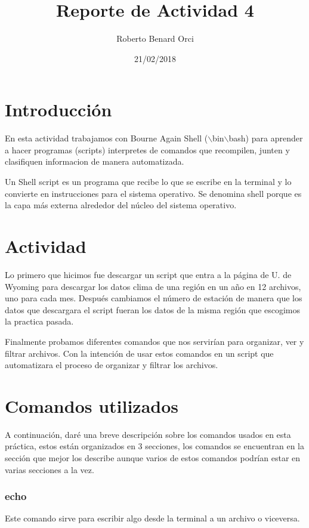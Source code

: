 \documentclass{article}
\title{Reporte de Actividad 4}
\author{Roberto Benard Orci}
\date{21/02/2018}
\begin{document}
\maketitle

\section{Introducción}
En esta actividad trabajamos con Bourne Again Shell ($\backslash$bin$\backslash$bash) para aprender a hacer programas (scripts) interpretes de comandos que recompilen, junten y clasifiquen informacion de manera automatizada.
 
Un Shell script es un programa que recibe lo que se escribe en la terminal y lo convierte en instrucciones para el sistema operativo. Se denomina shell porque es la capa más externa alrededor del núcleo del sistema operativo.

\section{Actividad}

Lo primero que hicimos fue descargar un script que entra a la página de U. de Wyoming para descargar los datos clima de una región en un año en 12 archivos, uno para cada mes. Después cambiamos el número de estación de manera que los datos que descargara el script fueran los datos de la misma región que escogimos la practica pasada. 

Finalmente probamos diferentes comandos que nos servirían para organizar, ver y filtrar archivos. Con la intención de usar estos comandos en un script que automatizara el proceso de organizar y filtrar los archivos.

\section*{Comandos utilizados}

A continuación, daré una breve descripción sobre los comandos usados en esta práctica, estos están organizados en 3 secciones, los comandos se encuentran en la sección que mejor los describe aunque varios de estos comandos podrían estar en varias secciones a la vez.

\subsubsection*{echo}
Este comando sirve para escribir algo desde la terminal a un archivo o viceversa.
\end{document}
